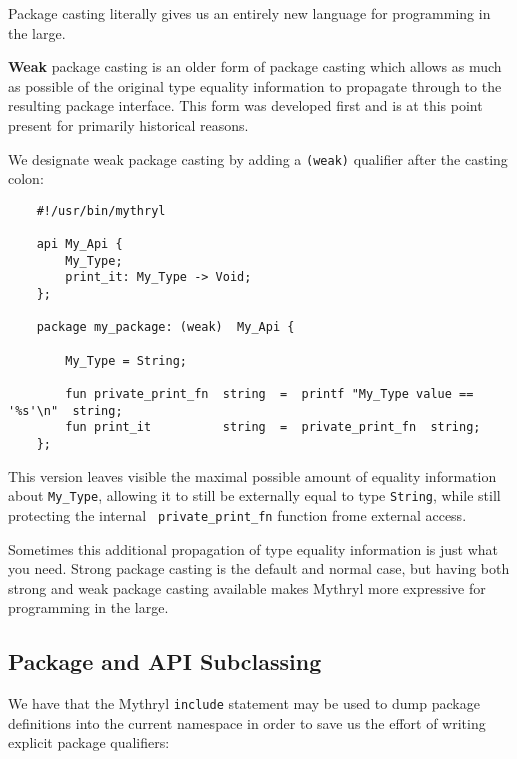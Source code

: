 Package casting literally gives us an entirely new language for programming 
in the large.


{\bf Weak} package casting is an older form of package casting which allows 
as much as possible of the original type equality information to 
propagate through to the resulting package interface.  This form was 
developed first and is at this point present for primarily historical reasons.

We designate weak package casting by adding a {\tt (weak)} qualifier after the 
casting colon:

\begin{verbatim}
    #!/usr/bin/mythryl

    api My_Api {
        My_Type;
        print_it: My_Type -> Void;
    };

    package my_package: (weak)  My_Api {

        My_Type = String;

        fun private_print_fn  string  =  printf "My_Type value == '%s'\n"  string;
        fun print_it          string  =  private_print_fn  string;
    };
\end{verbatim}
 
This version leaves visible the maximal possible amount of equality 
information about {\tt My\_Type}, allowing it to still be externally 
equal to type {\tt String}, while still protecting the internal {\tt 
private\_print\_fn} function frome external access.

Sometimes this additional propagation of type equality information 
is just what you need.  Strong package casting is the default and 
normal case, but having both strong and weak package casting 
available makes Mythryl more expressive for programming in the large.

\cutend*

\subsection{Package and API Subclassing}

We have  that 
the Mythryl {\tt include} statement may be used to dump package 
definitions into the current namespace in order to save us the 
effort of writing explicit package qualifiers:

